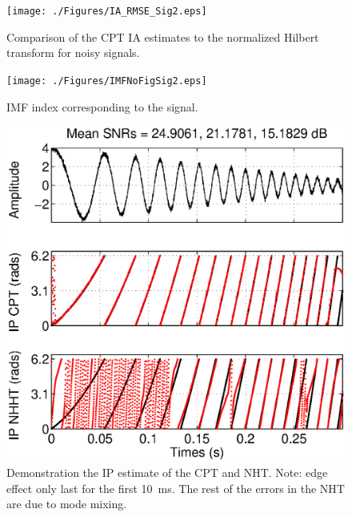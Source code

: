 \documentclass[journal,11pt,a4paper,onecolumn,draftcls]{IEEEtran}
\begin{document}
\begin{figure}[!ht]\label{fig:RMSEComparisonSig2_IA}
    \centering
        \texttt{[image: ./Figures/IA\_RMSE\_Sig2.eps]}
    \caption{Comparison of the CPT IA estimates to the normalized Hilbert transform for noisy signals.}
\end{figure}

\begin{figure}[!ht]\label{fig:label}
    \centering
        \texttt{[image: ./Figures/IMFNoFigSig2.eps]}
    \caption{IMF index corresponding to the signal.}
\end{figure}

\begin{figure}\label{CPTandNHTTogether}
    \centering
        \includegraphics[scale=0.42]{./Figures/CPTandNHHT_IPs_together.eps}
    \caption{Demonstration the IP estimate of the CPT and NHT. Note: edge effect only last for the first 10~ms. The rest of the errors in the NHT are due to mode mixing. }
\end{figure}
\end{document}
